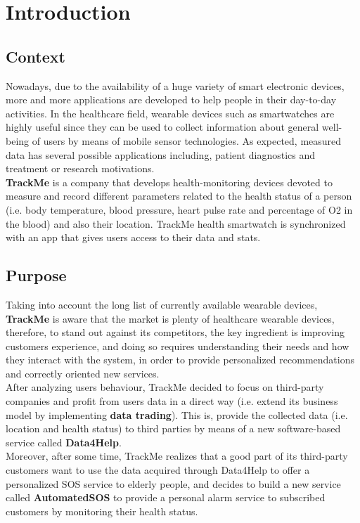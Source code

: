 \documentclass[a4paper, hidelinks, 12pt]{report}
\begin{document}
	\chapter{Introduction}
	\section{Context}
	Nowadays, due to the availability of a huge variety of smart electronic devices, more and more applications are developed to help people in their day-to-day activities. In the healthcare field, wearable devices such as smartwatches are highly useful since they can be used to collect information about general well-being of users by means of mobile sensor technologies. As expected, measured data has several possible applications including, patient diagnostics and treatment or research motivations. \\
	
	\textbf{TrackMe} is a company that develops health-monitoring devices devoted to measure and record different parameters related to the health status of a person (i.e. body temperature, blood pressure, heart pulse rate and percentage of O2 in the blood) and also their location. TrackMe health smartwatch is synchronized with an app that gives users access to their data and stats.
	
	\section{Purpose}
	Taking into account the long list of currently available wearable devices, \textbf{TrackMe}  is aware that the market is plenty of healthcare wearable devices, therefore, to stand out against its competitors, the key ingredient is improving customers experience, and doing so requires understanding their needs and how they interact with the system, in order to provide personalized recommendations and correctly oriented new services. \\
	
	After analyzing users behaviour, TrackMe decided to focus on third-party companies and profit from users data in a direct way (i.e. extend its business model by implementing \textbf{data trading}). This is, provide the collected data (i.e. location and health status) to third parties by means of a new software-based service called \textbf{Data4Help}. \\
	
	Moreover, after some time, TrackMe realizes that a good part of its third-party customers want to use the data acquired through Data4Help to offer a personalized SOS service to elderly people, and decides to build a new service called \textbf{AutomatedSOS} to provide a personal alarm service to subscribed customers by monitoring their health status. \\
	
\end{document}
